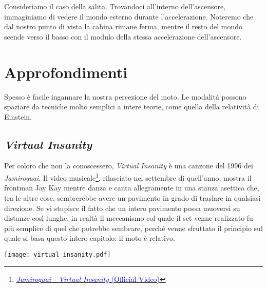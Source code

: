 Consideriamo il caso della salita. Trovandoci all'interno dell'ascensore,
immaginiamo di vedere il mondo esterno durante l'accelerazione. Noteremo
che dal nostro punto di vista la cabina rimane ferma, mentre il resto del
mondo scende verso il basso con il modulo della stessa accelerazione
dell'ascensore.


\section{Approfondimenti}
Spesso è facile ingannare la nostra percezione del moto. Le modalità
possono spaziare da tecniche molto semplici a intere teorie, come
quella della relatività di Einstein.

\subsection{\textit{Virtual Insanity}}
Per coloro che non la conoscessero, \textit{Virtual Insanity} è
una canzone del 1996 dei \textit{Jamiroquai}. Il video
musicale\footnote{\href{https://www.youtube.com/watch?v=4JkIs37a2JE}{\textcolor{blue}{\textit{Jamiroquai - Virtual Insanity} (Official Video)}}},
rilasciato nel settembre di quell'anno, mostra il frontman Jay Kay
mentre danza e canta allegramente in una stanza asettica che, tra
le altre cose, sembrerebbe avere un pavimento in grado di traslare
in qualsiasi direzione. Se vi stupisce il fatto che un intero
pavimento possa muoversi su distanze così lunghe, in realtà il
meccanismo col quale il set venne realizzato fu più semplice di
quel che potrebbe sembrare, perché venne sfruttato il principio
sul quale si basa questo intero capitolo: il moto è relativo.

\begin{marginfigure}
    \centering
    \texttt{[image: virtual\_insanity.pdf]}
    \caption{Schema semplificato del set realizzato per il video musicale:
    (1) telecamera fissata alla stanza mobile, (2) Jay Kay che si diverte,
    (3) stanza mobile, (4) pavimento del set.}
\end{marginfigure}


